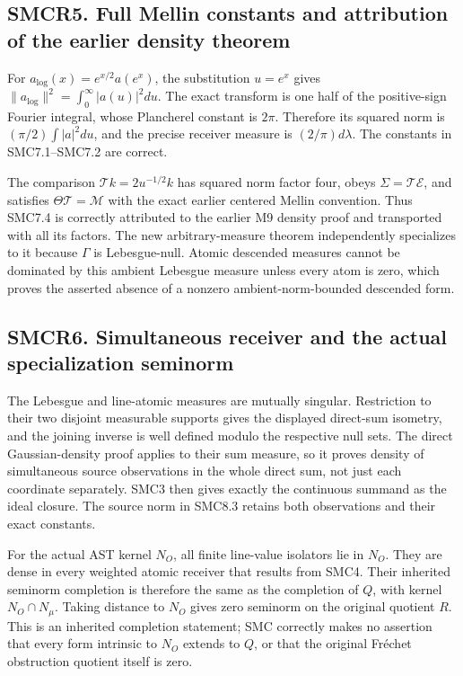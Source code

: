 \subsection{SMCR5. Full Mellin constants and attribution of the earlier
density
theorem}\label{smcr5.-full-mellin-constants-and-attribution-of-the-earlier-density-theorem}

For \(a_{\log}(x)=e^{x/2}a(e^x)\), the substitution \(u=e^x\) gives
\(\|a_{\log}\|^2=\int_0^\infty|a(u)|^2du\). The exact transform is one
half of the positive-sign Fourier integral, whose Plancherel constant is
\(2\pi\). Therefore its squared norm is \((\pi/2)\int|a|^2du\), and the
precise receiver measure is \((2/\pi)d\lambda\). The constants in
SMC7.1--SMC7.2 are correct.

The comparison \(\mathcal T k=2u^{-1/2}k\) has squared norm factor four,
obeys \(\Sigma=\mathcal T\mathcal E\), and satisfies
\(\Theta\mathcal T=\mathcal M\) with the exact earlier centered Mellin
convention. Thus SMC7.4 is correctly attributed to the earlier M9
density proof and transported with all its factors. The new
arbitrary-measure theorem independently specializes to it because
\(\Gamma\) is Lebesgue-null. Atomic descended measures cannot be
dominated by this ambient Lebesgue measure unless every atom is zero,
which proves the asserted absence of a nonzero ambient-norm-bounded
descended form.

\subsection{SMCR6. Simultaneous receiver and the actual specialization
seminorm}\label{smcr6.-simultaneous-receiver-and-the-actual-specialization-seminorm}

The Lebesgue and line-atomic measures are mutually singular. Restriction
to their two disjoint measurable supports gives the displayed direct-sum
isometry, and the joining inverse is well defined modulo the respective
null sets. The direct Gaussian-density proof applies to their sum
measure, so it proves density of simultaneous source observations in the
whole direct sum, not just each coordinate separately. SMC3 then gives
exactly the continuous summand as the ideal closure. The source norm in
SMC8.3 retains both observations and their exact constants.

For the actual AST kernel \(N_O\), all finite line-value isolators lie
in \(N_O\). They are dense in every weighted atomic receiver that
results from SMC4. Their inherited seminorm completion is therefore the
same as the completion of \(Q\), with kernel \(N_O\cap N_\mu\). Taking
distance to \(N_O\) gives zero seminorm on the original quotient \(R\).
This is an inherited completion statement; SMC correctly makes no
assertion that every form intrinsic to \(N_O\) extends to \(Q\), or that
the original Fréchet obstruction quotient itself is zero.

